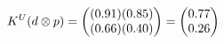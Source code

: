 \documentclass[preview]{standalone}
\begin{document}
\begin{align*}
\special{dvisvgm:raw <g id='unique000'>}K^U(d \otimes p) = \begin{pmatrix} (0.91)(0.85) \\ (0.66)(0.40) \end{pmatrix} = \begin{pmatrix} 0.77 \\ 0.26 \end{pmatrix}\special{dvisvgm:raw </g>}
\end{align*}
\end{document}
